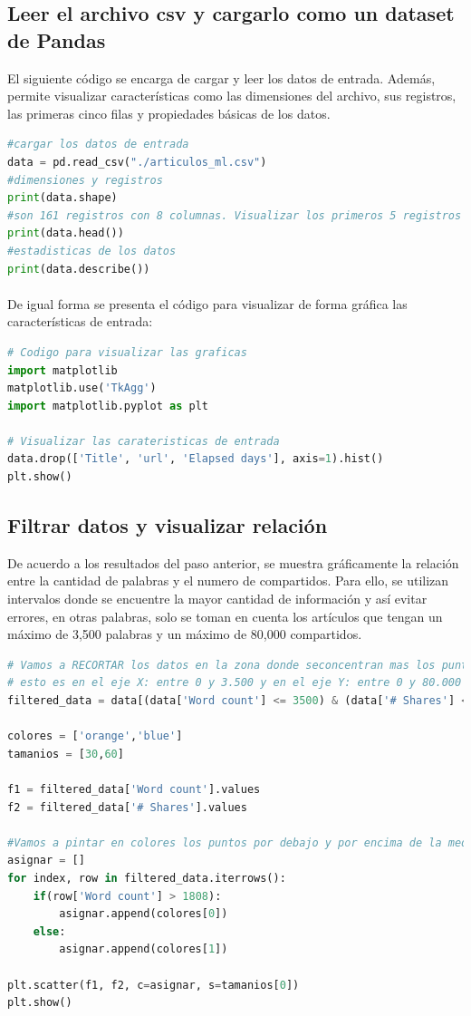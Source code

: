 \documentclass{article}
\begin{document}
\subsection{Leer el archivo csv y cargarlo como un dataset de Pandas}El siguiente código se encarga de cargar y leer los datos de entrada. Además,  permite visualizar características como las dimensiones del archivo, sus registros, las primeras cinco filas y propiedades básicas de los datos.
\begin{lstlisting}[language=Python]
#cargar los datos de entrada
data = pd.read_csv("./articulos_ml.csv")
#dimensiones y registros
print(data.shape)
#son 161 registros con 8 columnas. Visualizar los primeros 5 registros
print(data.head())
#estadisticas de los datos
print(data.describe())
\end{lstlisting}

\paragraph{}De igual forma se presenta el código para visualizar de forma gráfica las características de entrada:
\begin{lstlisting}[language=Python]
# Codigo para visualizar las graficas
import matplotlib
matplotlib.use('TkAgg') 
import matplotlib.pyplot as plt 

# Visualizar las carateristicas de entrada
data.drop(['Title', 'url', 'Elapsed days'], axis=1).hist()
plt.show()
\end{lstlisting}

\subsection{Filtrar datos y visualizar relación} De acuerdo a los resultados del paso anterior, se muestra gráficamente la relación entre la cantidad de palabras y el numero de compartidos. Para ello, se utilizan intervalos donde se encuentre la mayor cantidad de información y así evitar errores, en otras palabras, solo se toman en cuenta los artículos que tengan un máximo de 3,500 palabras y un máximo de 80,000 compartidos.
\begin{lstlisting}[language=Python]
# Vamos a RECORTAR los datos en la zona donde seconcentran mas los puntos
# esto es en el eje X: entre 0 y 3.500 y en el eje Y: entre 0 y 80.000
filtered_data = data[(data['Word count'] <= 3500) & (data['# Shares'] <= 80000)]

colores = ['orange','blue']
tamanios = [30,60]

f1 = filtered_data['Word count'].values
f2 = filtered_data['# Shares'].values

#Vamos a pintar en colores los puntos por debajo y por encima de la media de Cantidad de Palabras
asignar = []
for index, row in filtered_data.iterrows():
    if(row['Word count'] > 1808):
        asignar.append(colores[0])
    else:
        asignar.append(colores[1])

plt.scatter(f1, f2, c=asignar, s=tamanios[0])
plt.show()
\end{lstlisting}
\end{document}
